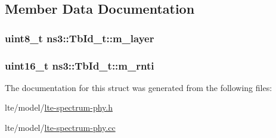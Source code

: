 \subsection{Member Data Documentation}
\subsubsection[{\texorpdfstring{m\+\_\+layer}{m_layer}}]{\setlength{\rightskip}{0pt plus 5cm}uint8\+\_\+t ns3\+::\+Tb\+Id\+\_\+t\+::m\+\_\+layer}\hypertarget{structns3_1_1TbId__t_a92aa1227d4d0c9d71f0f3e592b6a9ebf}{}\label{structns3_1_1TbId__t_a92aa1227d4d0c9d71f0f3e592b6a9ebf}
\subsubsection[{\texorpdfstring{m\+\_\+rnti}{m_rnti}}]{\setlength{\rightskip}{0pt plus 5cm}uint16\+\_\+t ns3\+::\+Tb\+Id\+\_\+t\+::m\+\_\+rnti}\hypertarget{structns3_1_1TbId__t_ad6668ec8859e597f95dc4c1b8dc2cc95}{}\label{structns3_1_1TbId__t_ad6668ec8859e597f95dc4c1b8dc2cc95}


The documentation for this struct was generated from the following files\+:\begin{DoxyCompactItemize}
\item 
lte/model/\hyperlink{lte-spectrum-phy_8h}{lte-\/spectrum-\/phy.\+h}\item 
lte/model/\hyperlink{lte-spectrum-phy_8cc}{lte-\/spectrum-\/phy.\+cc}\end{DoxyCompactItemize}
